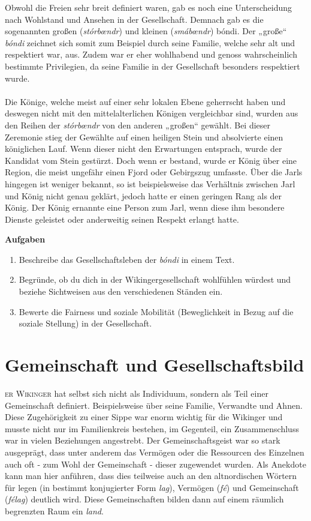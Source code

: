 \documentclass[12pt,a4paper,ngerman,openany]{book}
\newcommand{\flettrine}[2]{\lettrine[lines=2, depth=0, loversize=0.25, nindent=0.69pt, lraise=0.15]{\initfamily{#1}}{#2}}
\newcommand*\initfamily{\usefont{U}{GotIn}{xl}{n}}
\newcommand{\aufgaben}[1]{
  \begin{tcolorbox}
    \textbf{Aufgaben}
    \begin{enumerate}
      #1
    \end{enumerate}
  \end{tcolorbox}
} %
\newcommand{\erklaer}[2]{\leavevmode\marginpar{\footnotesize \textbf{#1:}\\#2}\ignorespaces} %
\begin{document}
Obwohl die Freien sehr breit definiert waren, gab es noch eine Unterscheidung nach Wohlstand und Ansehen in der Gesellschaft. Demnach gab es die sogenannten großen (\textit{stórbœndr}) und kleinen (\textit{smábœndr}) bóndi. 
Der „große“ \textit{bóndi} zeichnet sich somit zum Beispiel durch seine Familie, welche sehr alt und respektiert war, aus. Zudem war er eher wohlhabend und genoss wahrscheinlich bestimmte Privilegien, da seine Familie in der Gesellschaft besonders respektiert wurde.\\\\
Die Könige, welche meist auf einer sehr lokalen Ebene geherrscht haben und deswegen nicht mit den mittelalterlichen Königen vergleichbar sind, wurden aus den Reihen der \textit{stórbœndr} von den anderen „großen“ \erklaer{\textit{bœndr}}{Plural von \textit{bóndi}.} gewählt. Bei dieser Zeremonie stieg der Gewählte auf einen heiligen Stein und absolvierte einen königlichen Lauf. Wenn dieser nicht den Erwartungen entsprach, wurde der Kandidat vom Stein gestürzt. Doch wenn er bestand, wurde er König über eine Region, die meist ungefähr einen Fjord oder Gebirgszug umfasste.
Über die Jarls hingegen ist weniger bekannt, so ist beispielsweise das Verhältnis zwischen Jarl und König nicht genau geklärt, jedoch hatte er einen geringen Rang als der König. Der König ernannte eine Person zum Jarl, wenn diese ihm besondere Dienste geleistet oder anderweitig seinen Respekt erlangt hatte.

\aufgaben{
  \item Beschreibe das Gesellschaftsleben der \textit{bóndi} in einem Text.
  \item Begründe, ob du dich in der Wikingergesellschaft wohlfühlen würdest und beziehe Sichtweisen aus den verschiedenen Ständen ein.
  \item Bewerte die Fairness und soziale Mobilität (Beweglichkeit in Bezug auf die soziale Stellung) in der Gesellschaft.
}

\section{Gemeinschaft und Gesellschaftsbild}
\flettrine{D}{er Wikinger} hat selbst sich nicht als Individuum, sondern als Teil einer Gemeinschaft definiert. Beispielsweise über seine Familie, Verwandte und Ahnen. Diese Zugehörigkeit zu einer Sippe war enorm wichtig für die Wikinger und musste nicht nur im Familienkreis bestehen, im Gegenteil, ein Zusammenschluss war in vielen Beziehungen angestrebt. Der Gemeinschaftsgeist war so stark ausgeprägt, dass unter anderem das Vermögen oder die Ressourcen des Einzelnen auch oft - zum Wohl der Gemeinschaft - dieser zugewendet wurden. Als Anekdote kann man hier anführen, dass dies teilweise auch an den altnordischen Wörtern für legen (in bestimmt konjugierter Form \textit{lag}), Vermögen (\textit{fé}) und Gemeinschaft (\textit{félag}) deutlich wird. Diese Gemeinschaften bilden dann auf einem räumlich begrenzten Raum ein \textit{land}.
\end{document}

